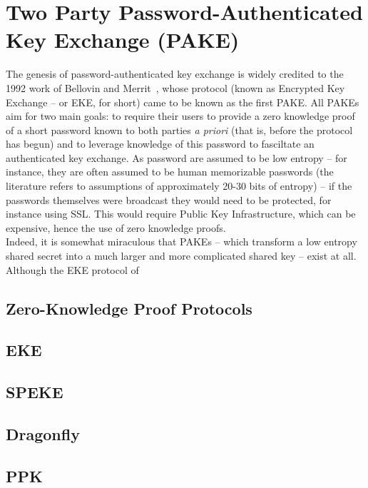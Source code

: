 \documentclass{amsart}
\theoremstyle{remark}
\begin{document}
\section{Two Party Password-Authenticated Key Exchange (PAKE)} 
\label{sec:PAKE}
 The genesis of password-authenticated key exchange is widely credited to the 1992 work of Bellovin and 
 Merrit~\cite{BeMe92}, whose protocol (known as Encrypted Key Exchange -- or EKE, for short) came to 
 be known as the first PAKE.  All PAKEs aim for two main goals: to require their users to provide a zero 
 knowledge proof of a short password known to both parties \emph{a priori} (that is, before the protocol 
 has begun) and to leverage knowledge of this password to fasciltate an authenticated key exchange.  As 
 password are assumed to be low entropy -- for instance, they are often assumed to be human memorizable 
 passwords (the literature refers to assumptions of approximately 20-30 bits of entropy) -- if the passwords 
 themselves were broadcast they would need to be protected, for instance using SSL.  This would require Public 
 Key Infrastructure, which can be expensive, hence the use of zero knowledge proofs.
 \\

 Indeed, it is somewhat miraculous that PAKEs -- which transform a low entropy shared secret into a 
 much larger and more complicated shared key -- exist at all.  Although the EKE protocol of 

\subsection{Zero-Knowledge Proof Protocols}


\subsection{EKE} 


\subsection{SPEKE}


\subsection{Dragonfly}
\label{sec:Dragon}


\subsection{PPK}
\label{sec:PPK}

\end{document}
